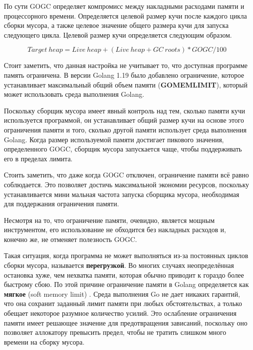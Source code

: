 По сути GOGC определяет компромисс между накладными расходами памяти и процессорного времени. Определяется целевой размер кучи после каждого цикла сборки мусора, а также целевое значение общего размера кучи для запуска следующего цикла. Целевой размер кучи определяется следующим образом. \cite{golang_gc_guide}

\begin{equation}
	Target\ heap = Live\ heap + (Live\ heap + GC\ roots) * GOGC / 100
\end{equation}

Стоит заметить, что данная настройка не учитывает то, что доступная программе память ограничена. В версии Golang 1.19 было добавлено ограничение, которое устанавливает максимальный общий объем памяти (\textbf{GOMEMLIMIT}), который может использовать среда выполнения Golang. \cite{golang_1_19} \cite{golang_proposal_limit}

Поскольку сборщик мусора имеет явный контроль над тем, сколько памяти кучи используется программой, он устанавливает общий размер кучи на основе этого ограничения памяти и того, сколько другой памяти использует среда выполнения Golang. Когда размер используемой памяти достигает пикового значения, определенного GOGC, сборщик мусора запускается чаще, чтобы поддерживать его в пределах лимита. \cite{golang_gc_guide}

Стоить заметить, что даже когда GOGC отключен, ограничение памяти всё равно соблюдается. Это позволяет достичь максимальной экономии ресурсов, поскольку устанавливается мини \cite{golang_gc_guide}мальная частота запуска сборщика мусора, необходимая для поддержания ограничения памяти.

Несмотря на то, что ограничение памяти, очевидно, является мощным инструментом, его использование не обходится без накладных расходов и, конечно же, не отменяет полезность GOGC. \cite{golang_gc_guide}

Такая ситуация, когда программа не может выполняться из-за постоянных циклов сборки мусора, называется \textbf{перегрузкой}. Во многих случаях неопределённая остановка хуже, чем нехватка памяти, которая обычно приводит к гораздо более быстрому сбою. По этой причине ограничение памяти в Golang определяется как \textbf{мягкое} (soft memory limit) \cite{golang_proposal_limit}. Среда выполнения Go не дает никаких гарантий, что она сохранит заданный лимит памяти при любых обстоятельствах, а только обещает некоторое разумное количество усилий. Это ослабление ограничения памяти имеет решающее значение для предотвращения зависаний, поскольку оно позволяет аллокатору превысить предел, чтобы не тратить слишком много времени на сборку мусора. \cite{golang_gc_guide}

